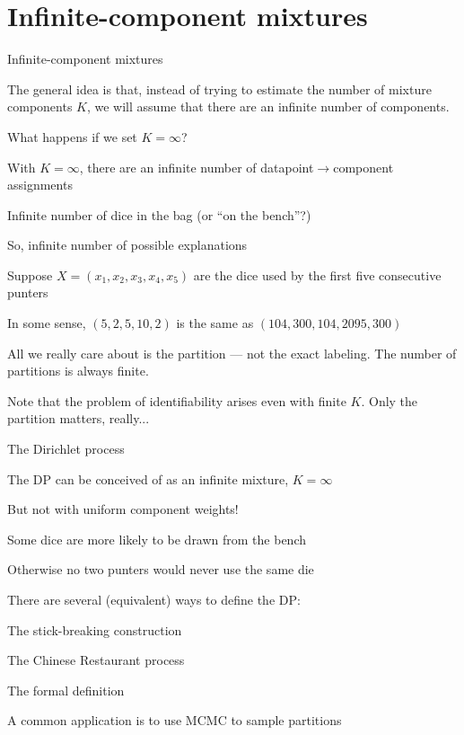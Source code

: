 \documentclass{beamer}
\begin{document}
\section{Infinite-component mixtures}

\begin{frame}{Infinite-component mixtures}

The general idea is that, instead of trying to estimate the number of mixture components $K$,
we will assume that there are an \alert{infinite} number of components.

\end{frame}

\begin{frame}{What happens if we set $K = \infty$?}

\itemb
\item With $K = \infty$, there are an infinite number of datapoint$\to$component assignments
 \itemb
 \item Infinite number of dice in the bag (or ``on the bench''?)
 \item So, infinite number of possible explanations
 \iteme
\item Suppose $X = (x_1, x_2, x_3, x_4, x_5)$ are the dice used by the first five consecutive punters
\item In some sense, $(5, 2, 5, 10, 2)$ is the same as $(104, 300, 104, 2095, 300)$
\item All we really care about is the \alert{partition} --- not the exact labeling. The number of partitions is always finite.
\item Note that the problem of \alert{identifiability} arises even with finite $K$. Only the partition matters, really...
\iteme

\end{frame}

\begin{frame}{The Dirichlet process}

\itemb
\item The DP can be conceived of as an infinite mixture, $K=\infty$
 \itemb
 \item But not with uniform component weights!
 \item Some dice are more likely to be drawn from the bench
 \item Otherwise no two punters would never use the same die
 \iteme
\item There are several (equivalent) ways to define the DP:
 \itemb
 \item The \alert{stick-breaking construction}
 \item The \alert{Chinese Restaurant process}
 \item The \alert{formal definition}
 \iteme
\item A common application is to use MCMC to sample partitions
\iteme

\end{frame}
\end{document}
